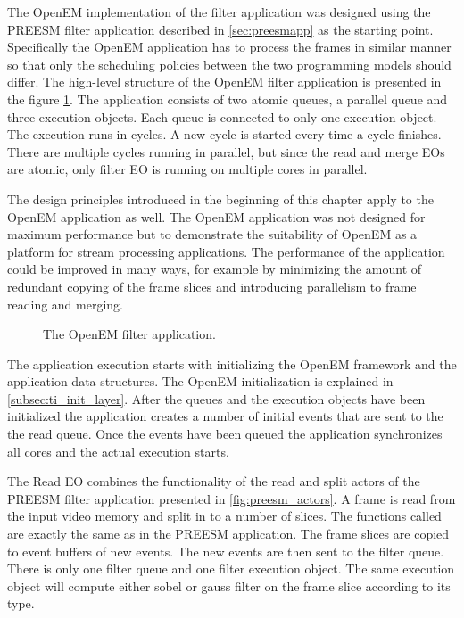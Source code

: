 The OpenEM implementation of the filter application was designed using the PREESM filter application described in \ref{sec:preesmapp} as the starting point. Specifically the OpenEM application has to process the frames in similar manner so that only the scheduling policies between the two programming models should differ. The high-level structure of the OpenEM filter application is presented in the figure \ref{fig:openem_flow}. The application consists of two atomic queues, a parallel queue and three execution objects. Each queue is connected to only one execution object. The execution runs in cycles. A new cycle is started every time a cycle finishes. There are multiple cycles running in parallel, but since the read and merge EOs are atomic, only filter EO is running on multiple cores in parallel.

The design principles introduced in the beginning of this chapter apply to the OpenEM application as well. The OpenEM application was not designed for maximum performance but to demonstrate the suitability of OpenEM as a platform for stream processing applications. The performance of the application could be improved in many ways, for example by minimizing the amount of redundant copying of the frame slices and introducing parallelism to frame reading and merging.  

\begin{figure}[h!]
    \begin{center}
        
        \caption{The OpenEM filter application.}
        \label{fig:openem_flow}
    \end{center}
\end{figure}

The application execution starts with initializing the OpenEM framework and the application data structures. The OpenEM initialization is explained in \ref{subsec:ti_init_layer}. After the queues and the execution objects have been initialized the application creates a number of initial events that are sent to the the read queue. Once the events have been queued the application synchronizes all cores and the actual execution starts.

The Read EO combines the functionality of the read and split actors of the PREESM filter application presented in \ref{fig:preesm_actors}. A frame is read from the input video memory and split in to a number of slices. The functions called are exactly the same as in the PREESM application. The frame slices are copied to event buffers of new events. The new events are then sent to the filter queue. There is only one filter queue and one filter execution object. The same execution object will compute either sobel or gauss filter on the frame slice according to its type.


